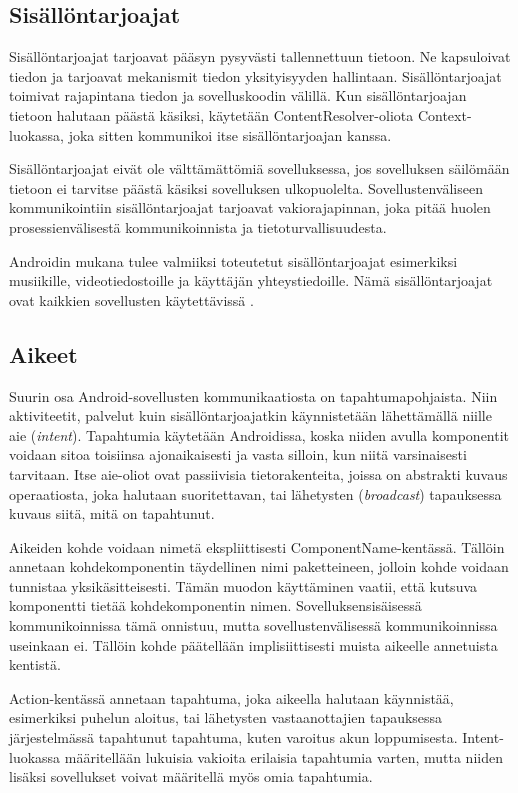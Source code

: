 \subsection{Sisällöntarjoajat}

Sisällöntarjoajat tarjoavat pääsyn pysyvästi tallennettuun tietoon. Ne kapsuloivat tiedon ja tarjoavat mekanismit tiedon yksityisyyden hallintaan. Sisällöntarjoajat toimivat rajapintana tiedon ja sovelluskoodin välillä. Kun sisällöntarjoajan tietoon halutaan päästä käsiksi, käytetään ContentResolver-oliota Context-luokassa, joka sitten kommunikoi itse sisällöntarjoajan kanssa.

Sisällöntarjoajat eivät ole välttämättömiä sovelluksessa, jos sovelluksen säilömään tietoon ei tarvitse päästä käsiksi sovelluksen ulkopuolelta. Sovellustenväliseen kommunikointiin sisällöntarjoajat tarjoavat vakiorajapinnan, joka pitää huolen prosessienvälisestä kommunikoinnista ja tietoturvallisuudesta.

Androidin mukana tulee valmiiksi toteutetut sisällöntarjoajat esimerkiksi musiikille, videotiedostoille ja käyttäjän yhteystiedoille. Nämä sisällöntarjoajat ovat kaikkien sovellusten käytettävissä \cite{android}.

\subsection{Aikeet}
\label{intents}

Suurin osa Android-sovellusten kommunikaatiosta on tapahtumapohjaista. Niin aktiviteetit, palvelut kuin sisällöntarjoajatkin käynnistetään lähettämällä niille aie (\emph{intent}). Tapahtumia käytetään Androidissa, koska niiden avulla komponentit voidaan sitoa toisiinsa ajonaikaisesti ja vasta silloin, kun niitä varsinaisesti tarvitaan. Itse aie-oliot ovat passiivisia tietorakenteita, joissa on abstrakti kuvaus operaatiosta, joka halutaan suoritettavan, tai lähetysten (\emph{broadcast}) tapauksessa kuvaus siitä, mitä on tapahtunut. 

Aikeiden kohde voidaan nimetä ekspliittisesti ComponentName-kentässä. Tällöin annetaan kohdekomponentin täydellinen nimi paketteineen, jolloin kohde voidaan tunnistaa yksikäsitteisesti. Tämän muodon käyttäminen vaatii, että kutsuva komponentti tietää kohdekomponentin nimen. Sovelluksensisäisessä kommunikoinnissa tämä onnistuu, mutta sovellustenvälisessä kommunikoinnissa useinkaan ei. Tällöin kohde päätellään implisiittisesti muista aikeelle annetuista kentistä.

Action-kentässä annetaan tapahtuma, joka aikeella halutaan käynnistää, esimerkiksi puhelun aloitus, tai lähetysten vastaanottajien tapauksessa järjestelmässä tapahtunut tapahtuma, kuten varoitus akun loppumisesta. Intent-luokassa määritellään lukuisia vakioita erilaisia tapahtumia varten, mutta niiden lisäksi sovellukset voivat määritellä myös omia tapahtumia.

